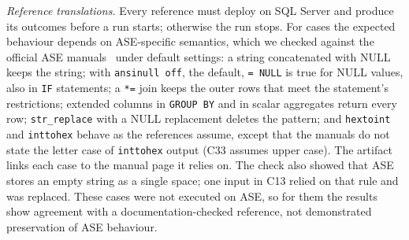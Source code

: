 \textit{Reference translations.} Every reference must deploy on SQL Server and produce its outcomes before
a run starts; otherwise the run stops. For \NumReviewCases{} cases the expected behaviour depends on
ASE-specific semantics, which we checked against the official ASE manuals~\cite{sybaseTSQLug,sybaseBlocks}
under default settings: a string concatenated with NULL keeps the string; with \texttt{ansinull off}, the
default, \texttt{= NULL} is true for NULL values, also in \texttt{IF} statements; a \texttt{*=} join keeps the
outer rows that meet the statement's restrictions; extended columns in \texttt{GROUP BY} and in scalar
aggregates return every row; \texttt{str\_replace} with a NULL replacement deletes the pattern; and
\texttt{hextoint} and \texttt{inttohex} behave as the references assume, except that the manuals do not
state the letter case of \texttt{inttohex} output (C33 assumes upper case). The artifact links each case to
the manual page it relies on. The check also showed that ASE stores an empty string as a single space; one
input in C13 relied on that rule and was replaced. These cases were not executed on ASE, so for them the
results show agreement with a documentation-checked reference, not demonstrated preservation of ASE
behaviour.
